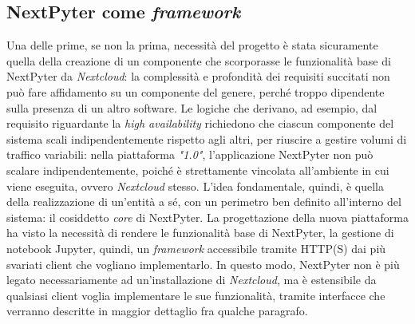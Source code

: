 \subsection{NextPyter come \textit{framework}}
Una delle prime, se non la prima, necessità del progetto è stata sicuramente quella della creazione di un componente che scorporasse le funzionalità base di NextPyter da \textit{Nextcloud}: la complessità e profondità dei requisiti succitati non può fare affidamento su un componente del genere, perché troppo dipendente sulla presenza di un altro software. Le logiche che derivano, ad esempio, dal requisito riguardante la \textit{high availability} richiedono che ciascun componente del sistema scali indipendentemente rispetto agli altri, per riuscire a gestire volumi di traffico variabili: nella piattaforma \textit{"1.0"}, l'applicazione NextPyter non può scalare indipendentemente, poiché è strettamente vincolata all'ambiente in cui viene eseguita, ovvero \textit{Nextcloud} stesso.
\newline
L'idea fondamentale, quindi, è quella della realizzazione di un'entità a sé, con un perimetro ben definito all'interno del sistema: il cosiddetto \textit{core} di NextPyter.
\newline
La progettazione della nuova piattaforma ha visto la necessità di rendere le funzionalità base di NextPyter, la gestione di notebook Jupyter, quindi, un \textit{framework} accessibile tramite HTTP(S) dai più svariati client che vogliano implementarlo. In questo modo, NextPyter non è più legato necessariamente ad un'installazione di \textit{Nextcloud}, ma è estensibile da qualsiasi client voglia implementare le sue funzionalità, tramite interfacce che verranno descritte in maggior dettaglio fra qualche paragrafo.
